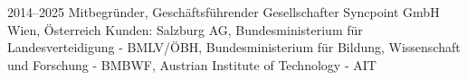 \cventry
{2014--2025}
{Mitbegründer, Geschäftsführender Gesellschafter}
{}
{Syncpoint GmbH}
{Wien, Österreich}
{
  Kunden: Salzburg AG,
  Bundesministerium für Landesverteidigung - BMLV/ÖBH,
  Bundesministerium für Bildung, Wissenschaft und Forschung - BMBWF,
  Austrian Institute of Technology - AIT
}
